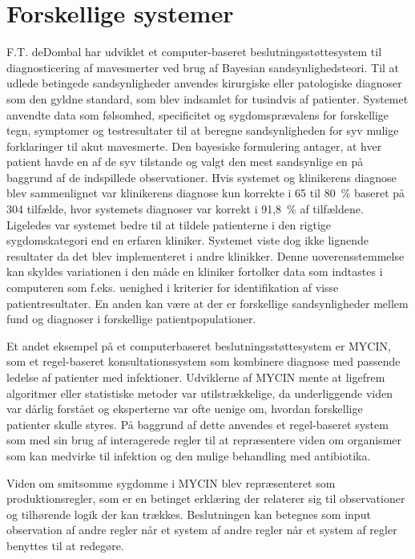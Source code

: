 \section{Forskellige systemer}
F.T. deDombal har udviklet et computer-baseret beslutningsstøttesystem til diagnosticering af mavesmerter ved brug af Bayesian sandsynlighedsteori. Til at udlede betingede  sandsynligheder anvendes kirurgiske eller patologiske diagnoser som den gyldne standard, som blev indsamlet for tusindvis af patienter. Systemet anvendte data som følsomhed, specificitet og sygdomsprævalens for forskellige tegn, symptomer og testresultater til at beregne sandsynligheden for syv mulige forklaringer til akut mavesmerte. Den bayesiske formulering antager, at hver patient havde en af de syv tilstande og valgt den mest sandsynlige en på baggrund af de indspillede observationer. Hvis systemet og klinikerens diagnose blev sammenlignet var klinikerens diagnose kun korrekte i 65 til 80~\% baseret på 304 tilfælde, hvor systemets diagnoser var korrekt i 91,8~\% af tilfældene. Ligeledes var systemet bedre til at tildele patienterne i den rigtige sygdomskategori end en erfaren kliniker. Systemet viste dog ikke lignende resultater da det blev implementeret i andre klinikker. Denne uoverensstemmelse kan skyldes variationen i den måde en kliniker fortolker data som indtastes i computeren som f.eks. uenighed i kriterier for identifikation af visse patientresultater. En anden kan være at der er forskellige sandsynligheder mellem fund og diagnoser i forskellige patientpopulationer.  \citep{Masys2006}

Et andet eksempel på et computerbaseret beslutningsstøttesystem er MYCIN, som et regel-baseret konsultationssystem som kombinere diagnose med passende ledelse af patienter med infektioner. Udviklerne af MYCIN mente at ligefrem algoritmer eller statistiske metoder var utilstrækkelige, da underliggende viden var dårlig forstået og eksperterne var ofte uenige om, hvordan forskellige patienter skulle styres. På baggrund af dette anvendes et regel-baseret system som med sin brug af interagerede regler til at repræsentere viden om organismer som kan medvirke til infektion og den mulige behandling med antibiotika.  \citep{Masys2006}

Viden om smitsomme sygdomme i MYCIN blev repræsenteret som produktionsregler, som er en betinget erklæring der relaterer sig til observationer og tilhørende logik der kan trækkes. Beslutningen kan betegnes som input observation af andre regler når et system af andre regler når et system af regler benyttes til at redegøre. \citep{Masys2006}

